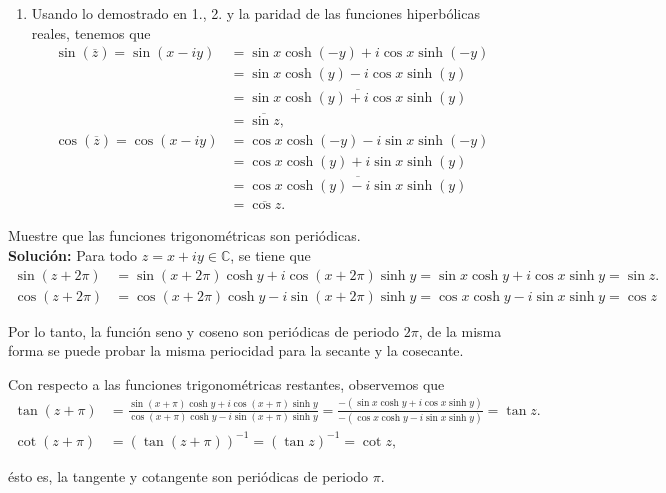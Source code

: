 \begin{ejemplo}
\begin{enumerate}
\item Usando lo demostrado en 1., 2. y la paridad de las funciones hiperbólicas reales, tenemos que
\begin{align*}
\sin( \overline{z}) = \sin(x-iy) &= \sin x \cosh(-y) + i \cos x \sinh(-y) \\
&= \sin x \cosh(y) - i \cos x \sinh(y) \\
&= \overline{\sin x \cosh(y) + i \cos x \sinh(y)} \\
&= \overline{\sin z}, \\
\cos( \overline{z}) = \cos(x-iy) &= \cos x \cosh(-y) - i \sin x \sinh(-y) \\
&= \cos x \cosh(y) + i \sin x \sinh(y) \\
&= \overline{\cos x \cosh(y) - i \sin x \sinh(y)} \\
&= \overline{\cos z}.
\end{align*}
\end{enumerate}
\end{ejemplo}

\begin{ejemplo}
Muestre que las funciones trigonométricas son periódicas.
\\

\textbf{Solución:} Para todo $z = x+iy \in \mathbb{C}$, se tiene que 
\begin{align*}
\sin(z + 2\pi) &= \sin(x + 2\pi) \cosh y + i \cos(x + 2\pi) \sinh y = \sin x \cosh y + i \cos x \sinh y = \sin z. \\
\cos(z + 2\pi) &= \cos(x+2\pi) \cosh y - i \sin(x+2\pi) \sinh y = \cos x \cosh y - i \sin x \sinh y = \cos z
\end{align*}

Por lo tanto, la función seno y coseno son periódicas de periodo $2\pi$, de la misma forma se puede probar la misma periocidad para la secante y la cosecante. 

Con respecto a las funciones trigonométricas restantes, observemos que 
\begin{align*}
\tan(z + \pi) &= \frac{\sin(x + \pi) \cosh y + i \cos(x + \pi) \sinh y}{\cos(x+\pi) \cosh y - i \sin(x+\pi) \sinh y} = \frac{-(\sin x \cosh y + i \cos x \sinh y)}{-(\cos x\cosh y - i \sin x \sinh y)} = \tan z. \\
\cot(z + \pi) &= (\tan(z+\pi))^{-1} = (\tan z)^{-1} = \cot z,
\end{align*}

ésto es, la tangente y cotangente son periódicas de periodo $\pi$.

\end{ejemplo}

